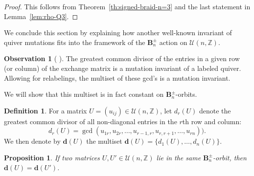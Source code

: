 \documentclass[11pt, letterpaper]{amsart}
\newtheorem{proposition}[theorem]{Proposition}
\theoremstyle{definition}
\newtheorem{definition}[theorem]{Definition}
\newtheorem{observation}[theorem]{Observation}
\numberwithin{equation}{section}
\def\ZZ{{\mathbb Z}}
\begin{document}
\begin{proof}
This follows from Theorem~\ref{th:signed-braid-n=3} and the last statement in Lemma~\ref{lem:rho-Q3}. 
\end{proof}


We conclude this section by explaining how another well-known invariant of quiver mutations
fits into the framework of the $\mathbf{B}_n^\pm$ action on $\mathcal{U}(n,\ZZ)$. 

\begin{observation}[{\cite{Seven3x3}%
}]
\label{obs:gcd-seven}
The greatest common divisor of the entries in a given row (or column) of the exchange matrix
is a mutation invariant of a labeled quiver. 
Allowing for relabelings, the multiset of these gcd's is a mutation invariant. 
\end{observation}

We will show that this multiset is in fact constant on $\mathbf{B}_n^\pm$-orbits. 

\begin{definition}
\label{def:d(U)}
For a matrix $U=(u_{ij})\in\mathcal{U}(n,\ZZ)$,
let $d_r(U)$ denote the greatest common divisor of all non-diagonal entries in the $r$th row and column: 
\begin{equation*}
d_r(U) = \operatorname{gcd}(u_{1r}, u_{2r}, \ldots, u_{r-1,r}, u_{r,r+1}, \ldots, u_{rn})). 
\end{equation*}
We then denote by $\mathbf{d}(U)$ the multiset $\mathbf{d}(U) = \{ d_1(U), \ldots, d_n(U)\}$.
\end{definition}

\begin{proposition}
\label{pr:gcd invariant of unipotent}
If two matrices $U,U'\in\mathcal{U}(n,\ZZ)$ lie in the same $\mathbf{B}_n^\pm$-orbit, 
then $\mathbf{d}(U) = \mathbf{d}(U')$. 
\end{proposition}
\end{document}
